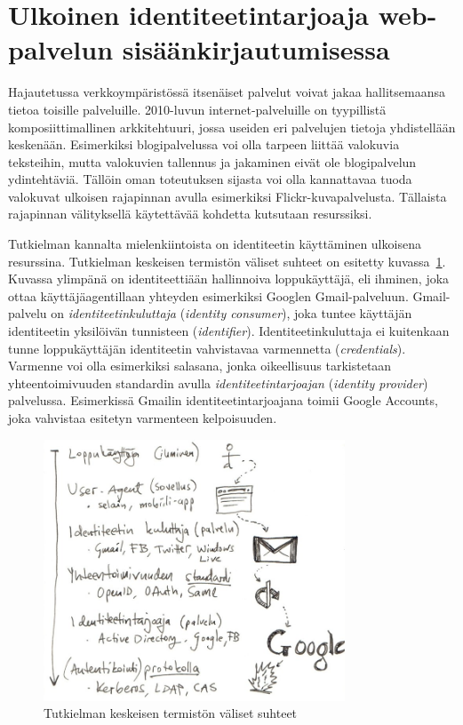 \documentclass[finnish,gradu]{tktltiki}
\begin{document}



\newpage
\section{Ulkoinen identiteetintarjoaja web-palvelun sisäänkirjautumisessa} %
\label{sec:kakkosluku}

  Hajautetussa verkkoympäristössä itsenäiset palvelut voivat jakaa hallitsemaansa tietoa toisille palveluille. 2010-luvun internet-palveluille on tyypillistä komposiittimallinen arkkitehtuuri, jossa useiden eri palvelujen tietoja yhdistellään keskenään. Esimerkiksi blogipalvelussa voi olla tarpeen liittää valokuvia teksteihin, mutta valokuvien tallennus ja jakaminen eivät ole blogipalvelun ydintehtäviä. Tällöin oman toteutuksen sijasta voi olla kannattavaa tuoda valokuvat ulkoisen rajapinnan avulla esimerkiksi Flickr-kuvapalvelusta. Tällaista rajapinnan välityksellä käytettävää kohdetta kutsutaan resurssiksi.

  Tutkielman kannalta mielenkiintoista on identiteetin käyttäminen ulkoisena resurssina. Tutkielman keskeisen termistön väliset suhteet on esitetty kuvassa~\ref{fig:yleiskuva_termien_suhteista}. Kuvassa ylimpänä on identiteettiään hallinnoiva loppukäyttäjä, eli ihminen, joka ottaa käyttäjäagentillaan yhteyden esimerkiksi Googlen Gmail-palveluun. Gmail-palvelu on \emph{identiteetinkuluttaja} (\emph{identity consumer}), joka tuntee käyttäjän identiteetin yksilöivän tunnisteen (\emph{identifier}). Identiteetinkuluttaja ei kuitenkaan tunne loppukäyttäjän identiteetin vahvistavaa varmennetta (\emph{credentials}). Varmenne voi olla esimerkiksi salasana, jonka oikeellisuus tarkistetaan yhteentoimivuuden standardin avulla \emph{identiteetintarjoajan} (\emph{identity provider}) palvelussa. Esimerkissä Gmailin identiteetintarjoajana toimii Google Accounts, joka vahvistaa esitetyn varmenteen kelpoisuuden.

\begin{figure}[h!]
  \centering
  \includegraphics[width=0.8\textwidth]{images/auth_yleiskuva.jpg}
  \caption{Tutkielman keskeisen termistön väliset suhteet}
  \label{fig:yleiskuva_termien_suhteista}
\end{figure}
\end{document}
